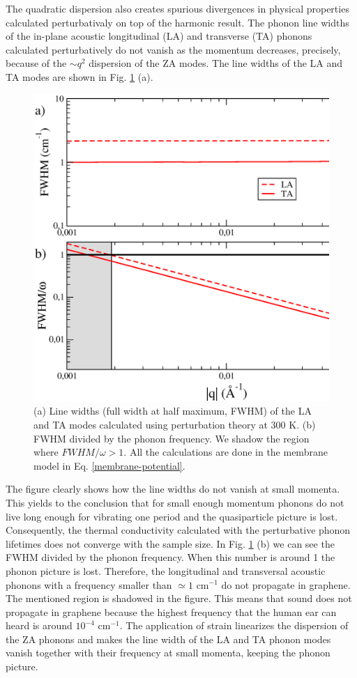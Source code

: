 The quadratic dispersion also creates spurious divergences in physical properties calculated perturbativaly on top of 
the harmonic result. The phonon line widths of the in-plane acoustic longitudinal (LA) and transverse (TA) phonons 
calculated perturbatively do not vanish as the momentum decreases\cite{paulatto2013anharmonic}, precisely, because of 
the $\sim q^2$ dispersion of the ZA modes\cite{bonini2012acoustic}. The line widths of the LA and TA modes are shown 
in Fig. \ref{lata-harmonic-lw} (a). 
\begin{figure}[h]
\includegraphics[width=0.8\linewidth]{Figures/lw-graphene-harmonic.eps}
	\caption[Graphene line widths calculated within perturbation theory]{(a) Line widths (full width at half 
	maximum, FWHM) of the LA and TA modes calculated using perturbation theory at 300 K. (b) FWHM divided by the 
	phonon frequency. We shadow the region where $FWHM/\omega>1$. All the calculations are done in the membrane 
	model in Eq. \ref{membrane-potential}.}
\label{lata-harmonic-lw}
\end{figure}
The figure clearly shows how the line widths do not vanish at small momenta. This yields to the conclusion that for 
small enough momentum phonons do not live long enough for vibrating one period and the quasiparticle picture is lost.
Consequently, the thermal conductivity calculated with the perturbative phonon 
lifetimes\cite{fugallo2013ab,fugallo2014thermal} does not converge with the sample size\cite{bonini2012acoustic}. In 
Fig. \ref{lata-harmonic-lw} (b) we can see the FWHM divided by the phonon frequency. When this number is around 1 the 
phonon picture is lost. Therefore, the longitudinal and transversal acoustic phonons with a frequency smaller than 
$\simeq1$ cm$^{-1}$ do not propagate in graphene. The mentioned region is shadowed in the figure. This means that 
sound does not propagate in graphene because the highest frequency that the human ear can heard is around $10^{-4}$ 
cm$^{-1}$. The application of strain linearizes the dispersion of the ZA phonons and makes the line width of the LA 
and TA phonon modes vanish together with their frequency at small momenta, keeping the phonon 
picture\cite{bonini2012acoustic}. \\

